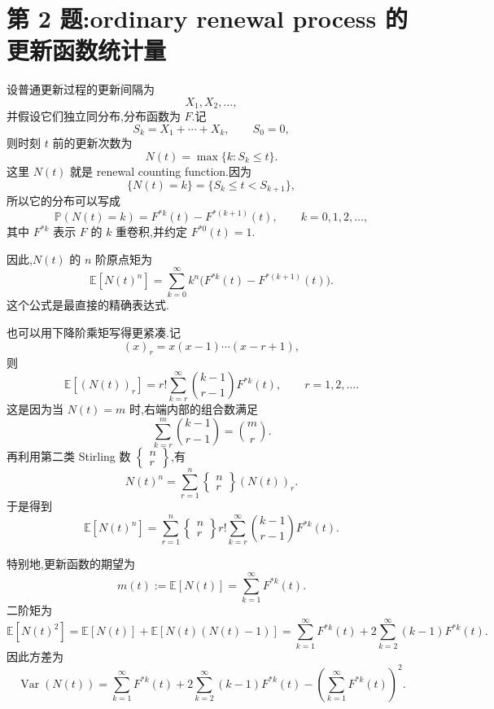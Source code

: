 \documentclass[oneside]{ctexart}
\DeclareMathOperator{\Var}{Var}
\begin{document}
\section{第 2 题:ordinary renewal process 的更新函数统计量}

设普通更新过程的更新间隔为
\[
    X_1,X_2,\ldots,
\]
并假设它们独立同分布,分布函数为 $F$.记
\[
    S_k=X_1+\cdots+X_k,
    \qquad S_0=0,
\]
则时刻 $t$ 前的更新次数为
\[
    N(t)=\max\{k:S_k\leq t\}.
\]
这里 $N(t)$ 就是 renewal counting function.因为
\[
    \{N(t)=k\}=\{S_k\leq t<S_{k+1}\},
\]
所以它的分布可以写成
\begin{equation}
    \mathbb P(N(t)=k)=F^{*k}(t)-F^{*(k+1)}(t),\qquad k=0,1,2,\ldots,
\end{equation}
其中 $F^{*k}$ 表示 $F$ 的 $k$ 重卷积,并约定 $F^{*0}(t)=1$.

因此,$N(t)$ 的 $n$ 阶原点矩为
\begin{equation}
    \mathbb E[N(t)^n]
    =\sum_{k=0}^{\infty} k^n\bigl(F^{*k}(t)-F^{*(k+1)}(t)\bigr).
\end{equation}
这个公式是最直接的精确表达式.

也可以用下降阶乘矩写得更紧凑.记
\[
    (x)_r=x(x-1)\cdots(x-r+1),
\]
则
\begin{equation}
    \mathbb E[(N(t))_r]
    =r!\sum_{k=r}^{\infty}\binom{k-1}{r-1}F^{*k}(t),
    \qquad r=1,2,\ldots .
\end{equation}
这是因为当 $N(t)=m$ 时,右端内部的组合数满足
\[
    \sum_{k=r}^{m}\binom{k-1}{r-1}=\binom{m}{r}.
\]
再利用第二类 Stirling 数 $\left\{\begin{matrix} n\\ r\end{matrix}\right\}$,有
\begin{equation}
    N(t)^n=\sum_{r=1}^{n}
    \left\{\begin{matrix} n\\ r\end{matrix}\right\}(N(t))_r .
\end{equation}
于是得到
\begin{equation}
    \boxed{
    \mathbb E[N(t)^n]
    =\sum_{r=1}^{n}
    \left\{\begin{matrix} n\\ r\end{matrix}\right\}
    r!\sum_{k=r}^{\infty}\binom{k-1}{r-1}F^{*k}(t)
    }.
\end{equation}

特别地,更新函数的期望为
\begin{equation}
    m(t):=\mathbb E[N(t)]
    =\sum_{k=1}^{\infty}F^{*k}(t).
\end{equation}
二阶矩为
\begin{equation}
    \mathbb E[N(t)^2]
    =\mathbb E[N(t)]+\mathbb E[N(t)(N(t)-1)]
    =\sum_{k=1}^{\infty}F^{*k}(t)
    +2\sum_{k=2}^{\infty}(k-1)F^{*k}(t).
\end{equation}
因此方差为
\begin{equation}
    \boxed{
    \Var(N(t))
    =\sum_{k=1}^{\infty}F^{*k}(t)
    +2\sum_{k=2}^{\infty}(k-1)F^{*k}(t)
    -\left(\sum_{k=1}^{\infty}F^{*k}(t)\right)^2
    }.
\end{equation}
\end{document}
